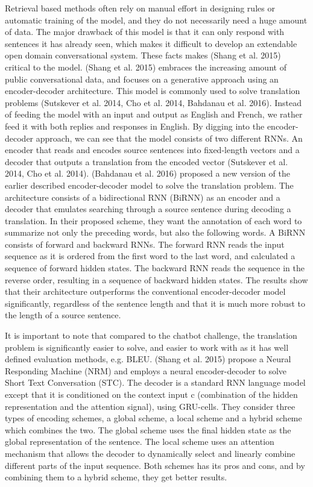 \documentclass{article} %
\begin{document}
Retrieval based methods often rely on manual effort in designing rules or  automatic training of the model, and they do not necessarily need a huge amount of data. The major drawback of this model is that it can only respond with sentences it has already seen, which makes it difficult to develop an extendable open domain conversational system. These facts makes (Shang et al. 2015) critical to the model. (Shang et al. 2015) embraces the increasing amount of public conversational data, and focuses on a generative approach using an encoder-decoder architecture. This model is commonly used to solve translation problems (Sutskever et al. 2014, Cho et al. 2014, Bahdanau et al. 2016). Instead of feeding the model with an input and output as English and French, we rather feed it with both replies and  responses in English. By digging into the encoder-decoder approach, we can see that the model consists of two different RNNs. An encoder that reads and encodes source sentences into fixed-length vectors and a decoder that outputs a translation from the encoded vector (Sutskever et al. 2014, Cho et al. 2014). (Bahdanau et al. 2016) proposed a new version of the earlier described encoder-decoder model to solve the translation problem. The architecture consists of a bidirectional RNN (BiRNN) as an encoder and a decoder that emulates searching through a source sentence during decoding a translation. In their proposed scheme, they want the annotation of each word to summarize not only the preceding words, but also the following words. A BiRNN consists of forward and backward RNNs. The forward RNN reads the input sequence as it is ordered from the first word to the last word, and calculated a sequence of forward hidden states. The backward RNN reads the sequence in the reverse order, resulting in a sequence of backward hidden states. The results show that their architecture outperforms the conventional encoder-decoder model significantly, regardless of the sentence length and that it is much more robust to the length of a source sentence.

It is important to note that compared to the chatbot challenge, the translation problem is significantly easier to solve, and easier to work with as it has well defined evaluation methods, e.g. BLEU. (Shang et al. 2015) propose a Neural Responding Machine (NRM) and employs a neural encoder-decoder to solve Short Text Conversation (STC). The decoder is a standard RNN language model except that it is conditioned on the context input c (combination of the hidden representation and the attention signal), using GRU-cells. They consider three types of encoding schemes, a global scheme, a local scheme and a hybrid scheme which combines the two. The global scheme uses the final hidden state as the global representation of the sentence. The local scheme uses an attention mechanism that allows the decoder to dynamically select and linearly combine different parts of the input sequence. Both schemes has its pros and cons, and by combining them to a hybrid scheme, they get better results. 
\end{document}
